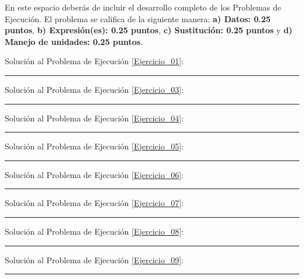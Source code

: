 \documentclass[12pt, letter]{exam}
\begin{document}
\newpage

En este espacio deberás de incluir el desarrollo completo de los Problemas de Ejecución. El problema se califica de la siguiente manera: \textbf{a) Datos: 0.25 puntos}, \textbf{b) Expresión(es): 0.25 puntos}, \textbf{c) Sustitución: 0.25 puntos} y \textbf{d) Manejo de unidades: 0.25 puntos}.

\vspace*{0.5cm}

Solución al Problema de Ejecución \ref{Ejercicio_01}:

\vspace*{3.5cm}
\rule{0.9\textwidth}{0.3mm}

Solución al Problema de Ejecución \ref{Ejercicio_03}:

\vspace*{3.5cm}
\rule{0.9\textwidth}{0.3mm}



Solución al Problema de Ejecución \ref{Ejercicio_04}:

\vspace*{3.5cm}
\rule{0.9\textwidth}{0.3mm}



Solución al Problema de Ejecución \ref{Ejercicio_05}: 

\vspace*{3.5cm}
\rule{0.9\textwidth}{0.3mm}

\newpage

Solución al Problema de Ejecución \ref{Ejercicio_06}:

\vspace*{3.5cm}
\rule{0.9\textwidth}{0.3mm}

Solución al Problema de Ejecución \ref{Ejercicio_07}:

\vspace*{3.5cm}
\rule{0.9\textwidth}{0.3mm}

Solución al Problema de Ejecución \ref{Ejercicio_08}:

\vspace*{3.5cm}
\rule{0.9\textwidth}{0.3mm}

Solución al Problema de Ejecución \ref{Ejercicio_09}:

\vspace*{3.5cm}
\rule{0.9\textwidth}{0.3mm}
\end{document}
